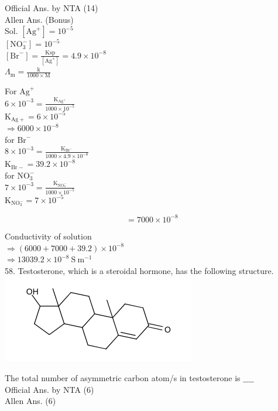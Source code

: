 \documentclass[10pt]{article}
\begin{document}
Official Ans. by NTA (14)\\
Allen Ans. (Bonus)\\
Sol. \(\left[\mathrm{Ag}^{+}\right]=10^{-5}\)\\
\(\left[\mathrm{NO}_{3}^{-}\right]=10^{-5}\)\\
\(\left[\mathrm{Br}^{-}\right]=\frac{\mathrm{Ksp}}{\left[\mathrm{Ag}^{+}\right]}=4.9 \times 10^{-8}\)\\
\(\Lambda_{\mathrm{m}}=\frac{\mathrm{k}}{1000 \times \mathrm{M}}\)

For \(\mathrm{Ag}^{+}\)\\
\(6 \times 10^{-3}=\frac{\mathrm{K}_{\mathrm{Ag}^{+}}}{1000 \times 10^{-5}}\)\\
\(\mathrm{K}_{\mathrm{Ag}+}=6 \times 10^{-5}\)\\
\(\Rightarrow 6000 \times 10^{-8}\)\\
for \(\mathrm{Br}^{-}\)\\
\(8 \times 10^{-3}=\frac{\mathrm{K}_{\mathrm{Br}^{-}}}{1000 \times 4.9 \times 10^{-8}}\)\\
\(\mathrm{K}_{\mathrm{Br}-}=39.2 \times 10^{-8}\)\\
for \(\mathrm{NO}_{3}^{-}\)\\
\(7 \times 10^{-3}=\frac{\mathrm{K}_{\mathrm{NO}_{3}^{-}}}{1000 \times 10^{-5}}\)\\
\(\mathrm{K}_{\mathrm{NO}_{3}^{-}}=7 \times 10^{-5}\)

\[
=7000 \times 10^{-8}
\]

Conductivity of solution\\
\(\Rightarrow(6000+7000+39.2) \times 10^{-8}\)\\
\(\Rightarrow 13039.2 \times 10^{-8} \mathrm{~S} \mathrm{~m}^{-1}\)\\
58. Testosterone, which is a steroidal hormone, has the following structure.\\
\includegraphics{smile-d9077d3b1d9617d063086722df23629eb1021228}

The total number of asymmetric carbon atom/s in testosterone is \(\_\_\_\_\)\\
Official Ans. by NTA (6)\\
Allen Ans. (6)
\end{document}
